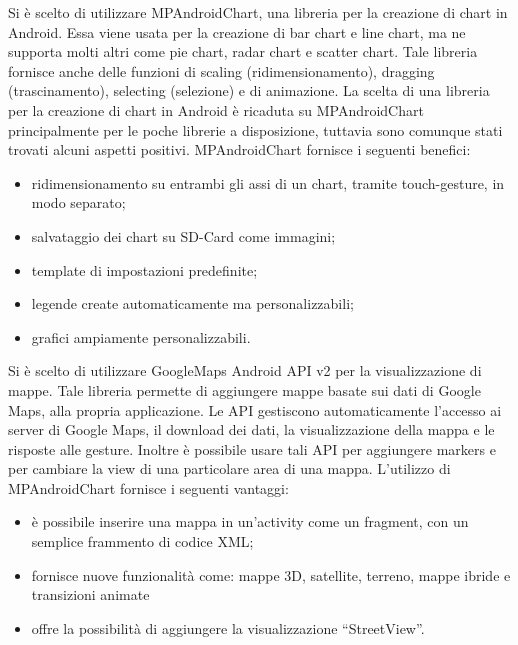 Si è scelto di utilizzare MPAndroidChart, una libreria per la creazione di chart in Android. Essa viene usata per la creazione di bar chart e line chart, ma ne supporta molti altri come pie chart, radar chart e scatter chart. Tale libreria fornisce anche delle funzioni di scaling (ridimensionamento), dragging (trascinamento), selecting (selezione) e di animazione. La scelta di una libreria per la creazione di chart in Android è ricaduta su MPAndroidChart principalmente per le poche librerie a disposizione, tuttavia sono comunque stati trovati alcuni aspetti positivi.
MPAndroidChart fornisce i seguenti benefici:
\begin{itemize}
\item ridimensionamento su entrambi gli assi di un chart, tramite touch-gesture, in modo separato;
\item salvataggio dei chart su SD-Card come immagini;
\item template di impostazioni predefinite;
\item legende create automaticamente ma personalizzabili;
\item grafici ampiamente personalizzabili.
\end{itemize}

Si è scelto di utilizzare GoogleMaps Android API v2 per la visualizzazione di mappe. Tale libreria permette di aggiungere mappe basate sui dati di Google Maps, alla propria applicazione. Le API gestiscono automaticamente l'accesso ai server di Google Maps, il download dei dati, la visualizzazione della mappa e le risposte alle gesture. Inoltre è possibile usare tali API per aggiungere markers e per cambiare la view di una particolare area di una mappa.
L'utilizzo di MPAndroidChart fornisce i seguenti vantaggi:
\begin{itemize}
\item è possibile inserire una mappa in un'activity come un fragment, con un semplice frammento di codice XML;
\item fornisce nuove funzionalità come: mappe 3D, satellite, terreno, mappe ibride e transizioni animate
\item offre la possibilità di aggiungere la visualizzazione “StreetView”.
\end{itemize}